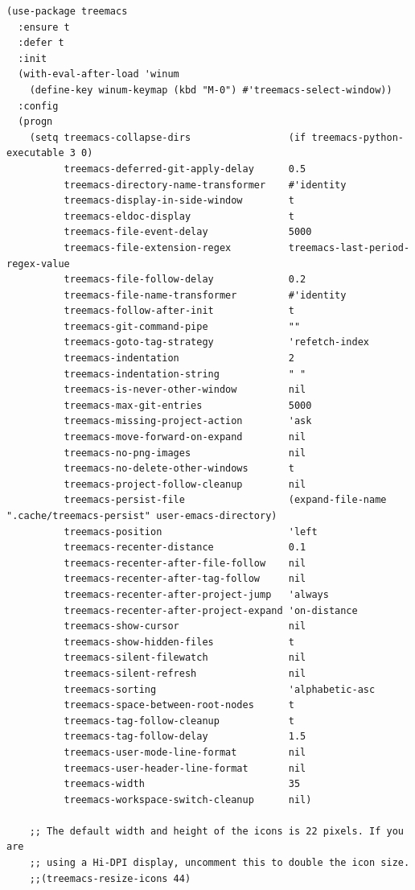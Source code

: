 \documentclass[11pt]{article}
\begin{document}
\begin{verbatim}
(use-package treemacs
  :ensure t
  :defer t
  :init
  (with-eval-after-load 'winum
    (define-key winum-keymap (kbd "M-0") #'treemacs-select-window))
  :config
  (progn
    (setq treemacs-collapse-dirs                 (if treemacs-python-executable 3 0)
          treemacs-deferred-git-apply-delay      0.5
          treemacs-directory-name-transformer    #'identity
          treemacs-display-in-side-window        t
          treemacs-eldoc-display                 t
          treemacs-file-event-delay              5000
          treemacs-file-extension-regex          treemacs-last-period-regex-value
          treemacs-file-follow-delay             0.2
          treemacs-file-name-transformer         #'identity
          treemacs-follow-after-init             t
          treemacs-git-command-pipe              ""
          treemacs-goto-tag-strategy             'refetch-index
          treemacs-indentation                   2
          treemacs-indentation-string            " "
          treemacs-is-never-other-window         nil
          treemacs-max-git-entries               5000
          treemacs-missing-project-action        'ask
          treemacs-move-forward-on-expand        nil
          treemacs-no-png-images                 nil
          treemacs-no-delete-other-windows       t
          treemacs-project-follow-cleanup        nil
          treemacs-persist-file                  (expand-file-name ".cache/treemacs-persist" user-emacs-directory)
          treemacs-position                      'left
          treemacs-recenter-distance             0.1
          treemacs-recenter-after-file-follow    nil
          treemacs-recenter-after-tag-follow     nil
          treemacs-recenter-after-project-jump   'always
          treemacs-recenter-after-project-expand 'on-distance
          treemacs-show-cursor                   nil
          treemacs-show-hidden-files             t
          treemacs-silent-filewatch              nil
          treemacs-silent-refresh                nil
          treemacs-sorting                       'alphabetic-asc
          treemacs-space-between-root-nodes      t
          treemacs-tag-follow-cleanup            t
          treemacs-tag-follow-delay              1.5
          treemacs-user-mode-line-format         nil
          treemacs-user-header-line-format       nil
          treemacs-width                         35
          treemacs-workspace-switch-cleanup      nil)

    ;; The default width and height of the icons is 22 pixels. If you are
    ;; using a Hi-DPI display, uncomment this to double the icon size.
    ;;(treemacs-resize-icons 44)


\end{verbatim}
\end{document}
